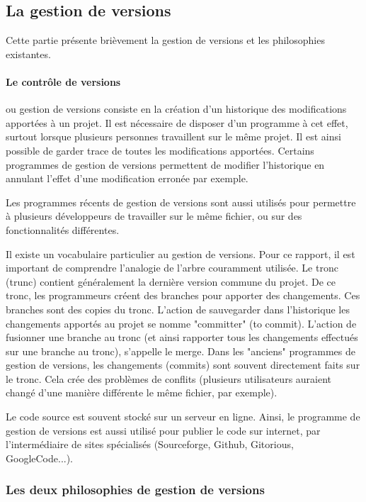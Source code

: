 \subsection{La gestion de versions}

Cette partie présente brièvement la gestion de versions et les philosophies existantes.

\paragraph{Le contrôle de versions} ou gestion de versions consiste en
la création d'un historique des modifications apportées à un projet.
Il est nécessaire de disposer d'un programme à cet effet,
surtout lorsque plusieurs personnes travaillent sur le même projet.
Il est ainsi possible de garder trace de toutes les modifications apportées.
Certains programmes de gestion de versions permettent
de modifier l'historique en annulant l'effet d'une modification erronée par exemple.

Les programmes récents de gestion de versions sont aussi utilisés
pour permettre à plusieurs développeurs de travailler 
sur le même fichier, ou sur des fonctionnalités différentes.

Il existe un vocabulaire particulier au gestion de versions.
Pour ce rapport, il est important de comprendre l'analogie de l'arbre couramment utilisée.
Le tronc (trunc) contient généralement la dernière version commune du projet.
De ce tronc, les programmeurs créent des branches pour apporter des changements.
Ces branches sont des copies du tronc.
L'action de sauvegarder dans l'historique les changements apportés au projet se nomme "committer" (to commit).
L'action de fusionner une branche au tronc
(et ainsi rapporter tous les changements effectués sur une branche au tronc), s'appelle le merge.
Dans les  "anciens" programmes de gestion de versions,
les changements (commits) sont souvent directement faits sur le tronc.
Cela crée des problèmes de conflits
(plusieurs utilisateurs auraient changé d'une manière différente le même fichier, par exemple).

Le code source est souvent stocké sur un serveur en ligne.
Ainsi, le programme de gestion de versions est aussi utilisé
pour publier le code sur internet, par l'intermédiaire de sites spécialisés
(Sourceforge, Github, Gitorious, GoogleCode...).



\subsubsection{Les deux philosophies de gestion de versions} 

